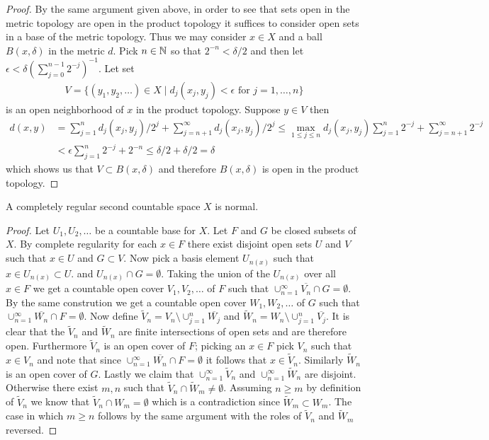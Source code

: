 \begin{proof}
By the same argument given above, in order to see that sets open in the metric topology are open in the product topology it suffices to consider open sets in a base of the metric topology.  Thus we may consider $x \in X$ and a ball $B(x, \delta)$ in the metric $d$.  Pick $n \in \mathbb{N}$ so that $2^{-n} < \delta/2$ and then let $\epsilon < \delta (\sum_{j=0}^{n-1} 2^{-j})^{-1}$.  Let set 
\begin{align*}
V = \lbrace (y_1, y_2, \dotsc ) \in X \mid d_j(x_j, y_j) < \epsilon \text{ for $j=1, \dotsc, n$} \rbrace
\end{align*}
is an open neighborhood of $x$ in the product topology.  Suppose $y \in V$ then 
\begin{align*}
d(x,y) &= \sum_{j=1}^n d_j(x_j, y_j)/2^j + \sum_{j=n+1}^\infty d_j(x_j, y_j)/2^j \leq \max_{1 \leq j \leq n} d_j(x_j, y_j)  \sum_{j=1}^n 2^{-j} + \sum_{j=n+1}^\infty 2^{-j} \\
&< \epsilon \sum_{j=1}^n 2^{-j} + 2^{-n} \leq \delta/2 + \delta/2 = \delta
\end{align*}
which shows us that $V \subset B(x,\delta)$ and therefore $B(x,\delta)$ is open in the product topology.  
\end{proof}

\begin{prop}\label{CompletelyRegularSeparableIsNormal}A completely regular second countable space $X$ is normal.
\end{prop}
\begin{proof}
Let $U_1, U_2, \dotsc$ be a countable base for $X$.  Let $F$ and $G$ be closed subsets of $X$.  By complete regularity for each $x \in F$ there exist disjoint open sets $U$ and $V$ such that $x \in U$
and $G \subset V$.  Now pick a basis element $U_{n(x)}$ such that $x \in U_{n(x)} \subset U$.  and $U_{n(x)} \cap G = \emptyset$.  Taking the union of the $U_{n(x)}$ over all $x \in F$ we get a countable
open cover $V_1, V_2, \dots$ of $F$ such that $\cup_{n=1}^\infty \overline{V_n} \cap G = \emptyset$.  By the same constrution we get a countable open cover $W_1, W_2, \dotsc$ of $G$ such that $\cup_{n=1}^\infty \overline{W_n} \cap F = \emptyset$.  Now define $\tilde{V}_n = V_n \setminus \cup_{j=1}^n \overline{W_j}$ and $\tilde{W}_n = W_n \setminus \cup_{j=1}^n \overline{V_j}$.  It is clear that 
the $\tilde{V}_n$ and $\tilde{W}_n$ are finite intersections of open sets and are therefore open.  Furthermore $\tilde{V}_n$ is an open cover of $F$; picking an $x \in F$ pick $V_n$ such that $x \in V_n$ and note that since $\cup_{n=1}^\infty \overline{W_n} \cap F = \emptyset$ it follows that $x \in \tilde{V}_n$.  Similarly $\tilde{W}_n$ is an open cover of $G$.  Lastly we claim that $\cup_{n=1}^\infty \tilde{V}_n$ and $\cup_{n=1}^\infty \tilde{W}_n$ are disjoint.  Otherwise there exist $m,n$ such that $\tilde{V}_n \cap \tilde{W}_m \neq \emptyset$.  Assuming $n \geq m$ by definition of $\tilde{V}_n$ we know that $\tilde{V}_n \cap W_m = \emptyset$ which is a contradiction since $\tilde{W}_m \subset W_m$.  The case in which $m \geq n$ follows by the same argument with the roles of $\tilde{V}_n$ and $\tilde{W}_m$ reversed.
\end{proof}

